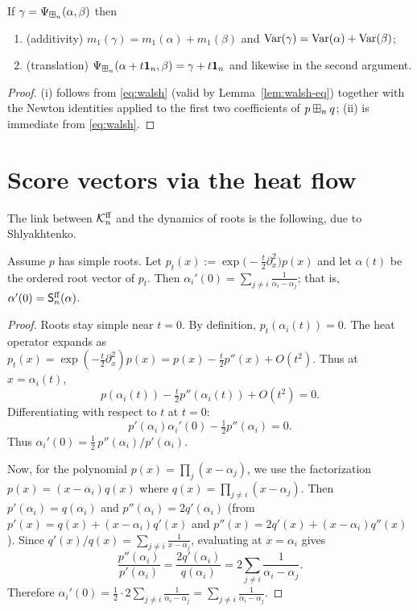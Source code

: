 \begin{qfourproposition}\label{prop:props}
If $\gamma=\Psi_{\boxplus_n}(\alpha,\beta)$ then
\begin{enumerate}\setlength\itemsep{2pt}
\item (additivity) $m_1(\gamma)=m_1(\alpha)+m_1(\beta)$ and
$\operatorname{Var}(\gamma)=\operatorname{Var}(\alpha)+\operatorname{Var}(\beta)$;
\item (translation) $\Psi_{\boxplus_n}(\alpha+t\mathbf 1_n,\beta)=\gamma+t\mathbf 1_n$
and likewise in the second argument.
\end{enumerate}
\end{qfourproposition}

\begin{proof}
(i) follows from \eqref{eq:walsh} (valid by Lemma~\ref{lem:walsh-eq})
together with the Newton identities applied to the first two coefficients of
$p\boxplus_n q$; (ii) is immediate from \eqref{eq:walsh}.
\end{proof}

\section*{Score vectors via the heat flow}

The link between $\mathcal{K}^{\mathrm{ff}}_n$ and the dynamics of roots is the following, due to
Shlyakhtenko.

\begin{qfourlemma}\label{lem:heat}
Assume $p$ has simple roots. Let $p_t(x):=\exp\!\bigl(-\tfrac{t}{2}\partial_x^2\bigr)p(x)$
and let $\alpha(t)$ be the ordered root vector of $p_t$. Then
$\alpha_i'(0)=\sum_{j\ne i}\frac{1}{\alpha_i-\alpha_j}$; that is,
$\alpha'(0)=\mathsf{S}^{\mathrm{ff}}_n(\alpha)$.
\end{qfourlemma}

\begin{proof}
Roots stay simple near $t=0$. By definition, $p_t(\alpha_i(t))=0$. The heat operator
expands as $p_t(x)=\exp(-\tfrac{t}{2}\partial_x^2)p(x)=p(x)-\tfrac{t}{2}p''(x)+O(t^2)$.
Thus at $x=\alpha_i(t)$,
\[
p(\alpha_i(t))-\tfrac{t}{2}p''(\alpha_i(t))+O(t^2)=0.
\]
Differentiating with respect to $t$ at $t=0$:
\[
p'(\alpha_i)\alpha_i'(0)-\tfrac{1}{2}p''(\alpha_i)=0.
\]
Thus $\alpha_i'(0)=\tfrac{1}{2}\,p''(\alpha_i)/p'(\alpha_i)$.

Now, for the polynomial $p(x)=\prod_j(x-\alpha_j)$, we use the factorization
$p(x)=(x-\alpha_i)q(x)$ where $q(x)=\prod_{j\ne i}(x-\alpha_j)$. Then
$p'(\alpha_i)=q(\alpha_i)$ and $p''(\alpha_i)=2q'(\alpha_i)$ (from $p'(x)=q(x)+(x-\alpha_i)q'(x)$
and $p''(x)=2q'(x)+(x-\alpha_i)q''(x)$). Since $q'(x)/q(x)=\sum_{j\ne i}\tfrac{1}{x-\alpha_j}$,
evaluating at $x=\alpha_i$ gives
\[
\frac{p''(\alpha_i)}{p'(\alpha_i)}=\frac{2q'(\alpha_i)}{q(\alpha_i)}=2\sum_{j\ne i}\frac{1}{\alpha_i-\alpha_j}.
\]
Therefore $\alpha_i'(0)=\tfrac{1}{2}\cdot 2\sum_{j\ne i}\tfrac{1}{\alpha_i-\alpha_j}=\sum_{j\ne i}\tfrac{1}{\alpha_i-\alpha_j}$.
\end{proof}

